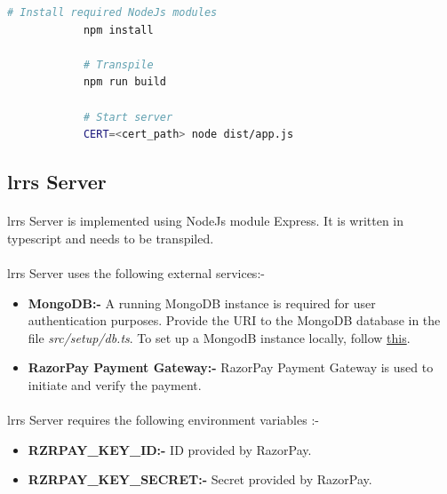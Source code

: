 \documentclass{article}
\begin{document}
        \begin{lstlisting}[language=bash, caption=Verification Server]
            # Install required NodeJs modules
            npm install
        
            # Transpile
            npm run build
        
            # Start server
            CERT=<cert_path> node dist/app.js
            \end{lstlisting}
    
    \subsection{\gls{lrrs} Server}
        \paragraph{}
        \gls{lrrs} Server is implemented using NodeJs module Express. It is written in typescript and needs to be transpiled.
    
        \paragraph{}
        \gls{lrrs} Server uses the following external services:-
        \begin{itemize}
            \item \textbf{MongoDB:-} A running MongoDB instance is required for user authentication purposes. Provide the URI to the MongoDB database in the file \textit{src/setup/db.ts}. To set up a MongodB instance locally, follow \href{https://docs.mongodb.com/manual/installation/}{this}.
            \item \textbf{RazorPay Payment Gateway:-} RazorPay Payment Gateway is used to initiate and verify the payment.
        \end{itemize}
    
        \paragraph{}
        \gls{lrrs} Server requires the following environment variables :-
        \begin{itemize}
            \item \textbf{RZRPAY\_KEY\_ID:-} ID provided by RazorPay.
            \item \textbf{RZRPAY\_KEY\_SECRET:-} Secret provided by RazorPay.
        \end{itemize}
        
\end{document}
